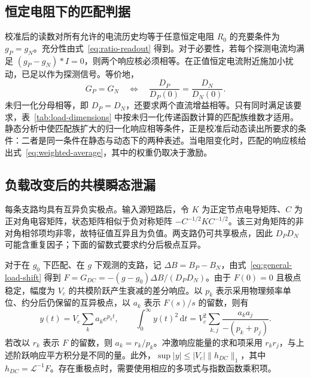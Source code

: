 

\subsection{恒定电阻下的匹配判据}
\label{sec:constant-resistance-match}

校准后的读数对所有允许的电流历史均等于任意恒定电阻 $R_0$ 的充要条件为 $g_P=g_N$。充分性由式~\eqref{eq:ratio-readout} 得到。对于必要性，若每个探测电流均满足 $(g_P-g_N)\ast I=0$，则两个响应核必须相等。在正值恒定电流附近施加小扰动，已足以作为探测信号。等价地，
\begin{equation}\label{eq:dynamic-normalized-match}
G_P=G_N\quad\Longleftrightarrow\quad
\frac{D_P}{D_P(0)}=\frac{D_N}{D_N(0)}.
\end{equation}
未归一化分母相等，即 $D_P=D_N$，还要求两个直流增益相等。只有同时满足该要求，表~\ref{tab:load-dimensions} 中按未归一化传递函数计算的匹配族维数才适用。静态分析中使匹配族扩大的归一化响应相等条件，正是校准后动态读出所要求的条件：二者是同一条件在静态与动态下的两种表述。当电阻变化时，匹配的响应核给出式~\eqref{eq:weighted-average}，其中的权重仍取决于激励。

\subsection{负载改变后的共模瞬态泄漏}
\label{sec:cm-pulse}

每条支路均具有互异负实极点。输入源短路后，令 $K$ 为正定节点电导矩阵、$C$ 为正对角电容矩阵，状态矩阵相似于负对称矩阵 $-C^{-1/2}KC^{-1/2}$。该三对角矩阵的非对角相邻项均非零，故特征值互异且为负值。两支路仍可共享极点，因此 $D_PD_N$ 可能含重复因子；下面的留数式要求约分后极点互异。

对于在 $g_0$ 下匹配、在 $g$ 下观测的支路，记 $\Delta B=B_P-B_N$，由式~\eqref{eq:general-load-shift} 得到 $F=G_{DC}=-(g-g_0)\Delta B/(D_PD_N)$。由于 $F(0)=0$ 且极点稳定，幅度为 $V_c$ 的共模阶跃产生衰减的差分响应。以 $p_k$ 表示采用物理频率单位、约分后仍保留的互异极点，以 $a_k$ 表示 $F(s)/s$ 的留数，则有
\begin{equation}\label{eq:cm-pulse}
y(t)=V_c\sum_k a_ke^{p_kt},\qquad
\int_0^\infty y(t)^2\,\mathrm dt
=V_c^2\sum_{k,j}\frac{a_ka_j}{-(p_k+p_j)}.
\end{equation}
若改以 $r_k$ 表示 $F$ 的留数，则 $a_k=r_k/p_k$。冲激响应能量的求和项采用 $r_kr_j$，与上述阶跃响应平方积分是不同的量。此外，$\sup|y|\le |V_c|\|h_{DC}\|_1$，其中 $h_{DC}=\mathcal L^{-1}F$。存在重极点时，需要使用相应的多项式与指数函数乘积项。


